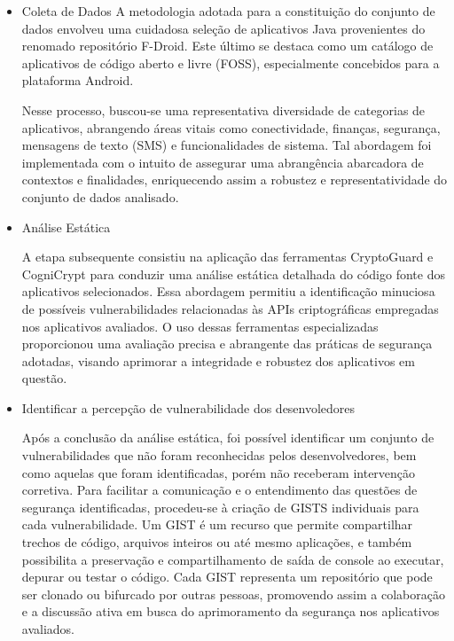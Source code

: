 \begin{itemize}
\item{Coleta de Dados}
A metodologia adotada para a constituição do conjunto de dados envolveu uma cuidadosa seleção de aplicativos Java provenientes do renomado repositório F-Droid. Este último se destaca como um catálogo de aplicativos de código aberto e livre (FOSS), especialmente concebidos para a plataforma Android.

Nesse processo, buscou-se uma representativa diversidade de categorias de aplicativos, abrangendo áreas vitais como conectividade, finanças, segurança, mensagens de texto (SMS) e funcionalidades de sistema. Tal abordagem foi implementada com o intuito de assegurar uma abrangência abarcadora de contextos e finalidades, enriquecendo assim a robustez e representatividade do conjunto de dados analisado.

\item{Análise Estática}

A etapa subsequente consistiu na aplicação das ferramentas CryptoGuard e CogniCrypt para conduzir uma análise estática detalhada do código fonte dos aplicativos selecionados. Essa abordagem permitiu a identificação minuciosa de possíveis vulnerabilidades relacionadas às APIs criptográficas empregadas nos aplicativos avaliados. O uso dessas ferramentas especializadas proporcionou uma avaliação precisa e abrangente das práticas de segurança adotadas, visando aprimorar a integridade e robustez dos aplicativos em questão.

\item{Identificar a percepção de vulnerabilidade dos desenvoledores}

Após a conclusão da análise estática, foi possível identificar um conjunto de vulnerabilidades que não foram reconhecidas pelos desenvolvedores, bem como aquelas que foram identificadas, porém não receberam intervenção corretiva. Para facilitar a comunicação e o entendimento das questões de segurança identificadas, procedeu-se à criação de GISTS individuais para cada vulnerabilidade. Um GIST é um recurso que permite compartilhar trechos de código, arquivos inteiros ou até mesmo aplicações, e também possibilita a preservação e compartilhamento de saída de console ao executar, depurar ou testar o código. Cada GIST representa um repositório que pode ser clonado ou bifurcado por outras pessoas, promovendo assim a colaboração e a discussão ativa em busca do aprimoramento da segurança nos aplicativos avaliados.


\end{itemize}
